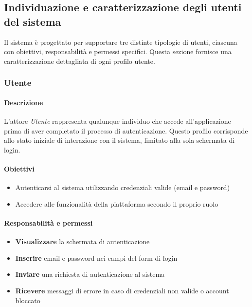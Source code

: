 \subsection{Individuazione e caratterizzazione degli utenti del sistema}
\label{sec:caratterizzazione-utenti}

Il sistema \productname{} è progettato per supportare tre distinte tipologie di utenti, ciascuna con obiettivi, responsabilità e permessi specifici. Questa sezione fornisce una caratterizzazione dettagliata di ogni profilo utente.

\subsubsection{Utente}
\label{subsec:utente}

\paragraph{Descrizione}
L'attore \textit{Utente} rappresenta qualunque individuo che accede all'applicazione \productname{} prima di aver completato il processo di autenticazione. Questo profilo corrisponde allo stato iniziale di interazione con il sistema, limitato alla sola schermata di login.

\paragraph{Obiettivi}
\begin{itemize}[leftmargin=1.1em]
\item Autenticarsi al sistema utilizzando credenziali valide (email e password)
\item Accedere alle funzionalità della piattaforma secondo il proprio ruolo
\end{itemize}

\paragraph{Responsabilità e permessi}
\begin{itemize}[leftmargin=1.1em]
\item \textbf{Visualizzare} la schermata di autenticazione
\item \textbf{Inserire} email e password nei campi del form di login
\item \textbf{Inviare} una richiesta di autenticazione al sistema
\item \textbf{Ricevere} messaggi di errore in caso di credenziali non valide o account bloccato
\end{itemize}

